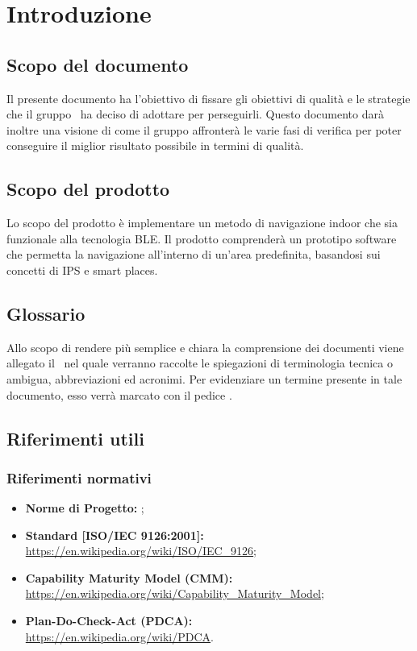 \documentclass[../PianoDiQualifica.tex]{subfiles}
\begin{document}
\section{Introduzione}
	\subsection{Scopo del documento}
	Il presente documento ha l'obiettivo di fissare gli obiettivi di qualità e le strategie che il gruppo \leaf\ ha deciso di adottare per perseguirli. Questo documento darà inoltre una visione di come il gruppo affronterà le varie fasi di verifica per poter conseguire il miglior risultato possibile in termini di qualità.
	\subsection{Scopo del prodotto}
	Lo scopo del prodotto è implementare un metodo di navigazione indoor che sia funzionale alla tecnologia BLE.
	Il prodotto comprenderà un prototipo software che permetta la navigazione all'interno di un'area predefinita, basandosi sui concetti di IPS e smart places.
	\subsection{Glossario}
	Allo scopo di rendere più semplice e chiara la comprensione dei documenti viene allegato il \glossariov\ nel quale verranno raccolte le spiegazioni di  terminologia tecnica o ambigua,
abbreviazioni ed acronimi. Per evidenziare un termine presente in tale documento, esso verrà marcato con il pedice \g.
	\subsection{Riferimenti utili}
		\subsubsection{Riferimenti normativi}
		\begin{itemize}
			\item \textbf{Norme di Progetto:} \normediprogettov;
			\item \textbf{Standard [ISO/IEC 9126:2001]:} \\\url{https://en.wikipedia.org/wiki/ISO/IEC\_9126};
			\item \textbf{Capability Maturity Model (CMM):} \\\url{https://en.wikipedia.org/wiki/Capability\_Maturity\_Model};
			\item \textbf{Plan-Do-Check-Act (PDCA):} \\\url{https://en.wikipedia.org/wiki/PDCA}.
		\end{itemize}
\end{document}
